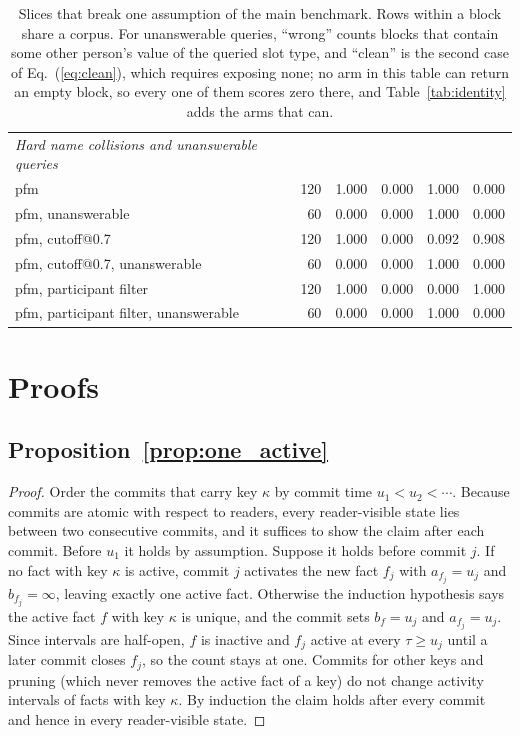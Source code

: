 \documentclass{article} %
\begin{document}
\begin{table}[h]
\begin{tabular}{@{}lrrrrr@{}}
\midrule
\emph{Hard name collisions and unanswerable queries} &  &  &  &  &  \\
pfm & 120 & 1.000 & 0.000 & 1.000 & 0.000 \\
pfm, unanswerable & 60 & 0.000 & 0.000 & 1.000 & 0.000 \\
pfm, cutoff@0.7 & 120 & 1.000 & 0.000 & 0.092 & 0.908 \\
pfm, cutoff@0.7, unanswerable & 60 & 0.000 & 0.000 & 1.000 & 0.000 \\
pfm, participant filter & 120 & 1.000 & 0.000 & 0.000 & 1.000 \\
pfm, participant filter, unanswerable & 60 & 0.000 & 0.000 & 1.000 & 0.000 \\
\bottomrule
\end{tabular}
\caption{Slices that break one assumption of the main benchmark. Rows within a block share a corpus. For unanswerable queries, ``wrong'' counts blocks that contain some other person's value of the queried slot type, and ``clean'' is the second case of Eq.~(\ref{eq:clean}), which requires exposing none; no arm in this table can return an empty block, so every one of them scores zero there, and Table~\ref{tab:identity} adds the arms that can.}
\label{tab:slices}
\end{table}
\section{Proofs}
\label{app:proofs}

\subsection{Proposition~\ref{prop:one_active}}

\begin{proof}
Order the commits that carry key $\kappa$ by commit time $u_1<u_2<\cdots$. Because commits are atomic with respect to readers, every reader-visible state lies between two consecutive commits, and it suffices to show the claim after each commit. Before $u_1$ it holds by assumption. Suppose it holds before commit $j$. If no fact with key $\kappa$ is active, commit $j$ activates the new fact $f_j$ with $a_{f_j}=u_j$ and $b_{f_j}=\infty$, leaving exactly one active fact. Otherwise the induction hypothesis says the active fact $f$ with key $\kappa$ is unique, and the commit sets $b_f=u_j$ and $a_{f_j}=u_j$. Since intervals are half-open, $f$ is inactive and $f_j$ active at every $\tau\ge u_j$ until a later commit closes $f_j$, so the count stays at one. Commits for other keys and pruning (which never removes the active fact of a key) do not change activity intervals of facts with key $\kappa$. By induction the claim holds after every commit and hence in every reader-visible state.
\end{proof}
\end{document}
